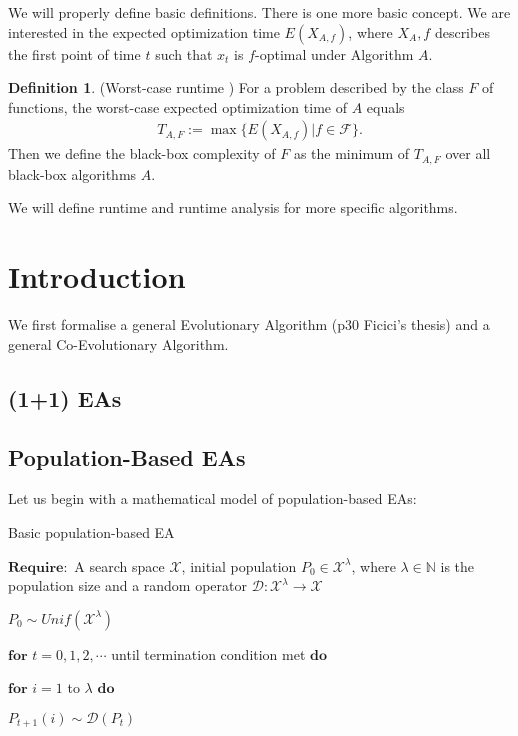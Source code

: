 \documentclass[a4paper,11pt]{report}
\theoremstyle{plain} %
\theoremstyle{definition} %
\newtheorem{defn}[thm]{Definition}
\theoremstyle{remark} %
\begin{document}
We will properly define basic definitions.  There is one more basic concept. We are interested in the expected optimization time $E(X_{A,f})$, where $X_A,f$ describes the first point of time $t$ such that $x_t$ is $f$-optimal under Algorithm $A$. 
\begin{defn} (Worst-case runtime \citep{droste_new_nodate})
For a problem described by the class $F$ of functions, the worst-case expected optimization time of $A$ equals 
\begin{align*}
T_{A,F} := \max\{ E(X_{A,f} )|f \in \mathcal{F}\}.
\end{align*}
Then we define the black-box complexity of $F$ as the minimum of $T_{A,F}$ over all black-box
algorithms $A$.
\end{defn}

We will define runtime and runtime analysis for more specific algorithms.


\section{Introduction}
\par We first formalise a general Evolutionary Algorithm (p30 Ficici's thesis) and a general Co-Evolutionary Algorithm. 

\subsection{(1+1) EAs}

\subsection{Population-Based EAs}
\par Let us begin with a mathematical model of population-based EAs:
\begin{algorithm}
\caption{Basic population-based EA \citep{Per2}}
    $\mathbf{Require:}$ 
    \newline A search space $\mathcal{X}$, initial population  $P_{0}\in \mathcal{X}^{\lambda }$, where $\lambda \in \mathbb{N}$ is the population size and a random operator $\mathcal{D}:\mathcal{X}^{\lambda}\rightarrow \mathcal{X}$
    
    $P_{0}\sim Unif (\mathcal{X}^{\lambda })$    
    
    $\mathbf{for}$ $t=0,1,2, \cdots$ until termination condition met $\mathbf{do}$
    
    \quad $\mathbf{for}$ $i=1$ to $\lambda$ $\mathbf{do}$
    
    \quad \quad  $P_{t+1}(i)\sim \mathcal{D} (P_{t})$ 
    
\end{algorithm}
\end{document}
